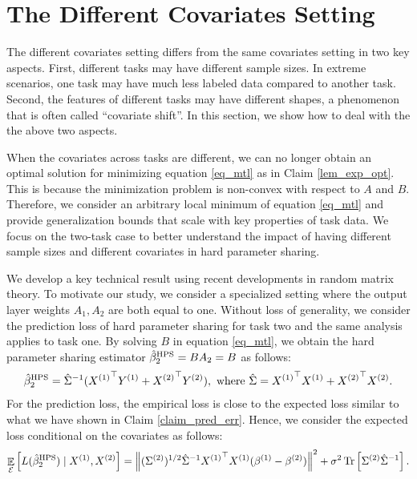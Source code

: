 \section{The Different Covariates Setting}\label{sec_diff}

The different covariates setting differs from the same covariates setting in two key aspects.
First, different tasks may have different sample sizes. In extreme scenarios, one task may have much less labeled data compared to another task.
Second, the features of different tasks may have different shapes, a phenomenon that is often called ``covariate shift''.
In this section, we show how to deal with the the above two aspects.

When the covariates across tasks are different, we can no longer obtain an optimal solution for minimizing equation \eqref{eq_mtl} as in Claim \ref{lem_exp_opt}.
This is because the minimization problem is non-convex with respect to $A$ and $B$.
Therefore, we consider an arbitrary local minimum of equation \eqref{eq_mtl} and provide generalization bounds that scale with key properties of task data.
We focus on the two-task case to better understand the impact of having different sample sizes and different covariates in hard parameter sharing.

We develop a key technical result using recent developments in random matrix theory.
To motivate our study, we consider a specialized setting where the output layer weights $A_1, A_2$ are both equal to one.
Without loss of generality, we consider the prediction loss of hard parameter sharing for task two and the same analysis applies to task one.
By solving $B$ in equation \eqref{eq_mtl}, we obtain the hard parameter sharing estimator $\hat{\beta}_2^{\textup{HPS}} = B A_2 = B$ as follows:
\begin{align*}
	\hat{\beta}_2^{\textup{HPS}} = {\hat{\Sigma}}^{-1} ({X^{(1)}}^{\top} Y^{(1)} + {X^{(2)}}^{\top} Y^{(2)}), \text{ where } \hat{\Sigma} = {X^{(1)}}^{\top} X^{(1)} + {X^{(2)}}^{\top} X^{(2)}.
\end{align*}
For the prediction loss, the empirical loss is close to the expected loss similar to what we have shown in Claim \ref{claim_pred_err}.
Hence, we consider the expected loss conditional on the covariates as follows:
\begin{align}\label{eq_diff_cov}
	\mathop{\mathbb{E}}_{\mathcal{E}}\left[ L(\hat{\beta}_2^{\textup{HPS}}) \mid X^{(1)}, X^{(2)} \right] =
	\left\| (\Sigma^{(2)})^{1/2} \hat{\Sigma}^{-1} {X^{(1)}}^{\top} X^{(1)} (\beta^{(1)} - \beta^{(2)}) \right\|^2
	+ \sigma^2 \operatorname{Tr}\left[\Sigma^{(2)}\hat{\Sigma}^{-1}\right].
\end{align}

